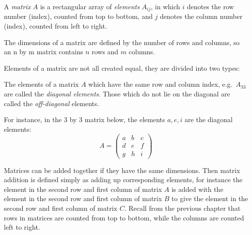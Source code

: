 \documentclass[
  letterpaper,
  DIV=11,
  numbers=noendperiod]{scrreprt}
\begin{document}
\begin{tcolorbox}[enhanced jigsaw, coltitle=black, arc=.35mm, opacitybacktitle=0.6, breakable, bottomtitle=1mm, toptitle=1mm, titlerule=0mm, colback=white, leftrule=.75mm, rightrule=.15mm, colframe=quarto-callout-note-color-frame, colbacktitle=quarto-callout-note-color!10!white, opacityback=0, title=\textcolor{quarto-callout-note-color}{\faInfo}\hspace{0.5em}{Definition}, left=2mm, toprule=.15mm, bottomrule=.15mm]

A \emph{matrix} \(A\) is a rectangular array of \emph{elements}
\(A_{ij}\), in which \(i\) denotes the row number (index), counted from
top to bottom, and \(j\) denotes the column number (index), counted from
left to right.

The dimensions of a matrix are defined by the number of rows and
columns, so an n by m matrix contains \(n\) rows and \(m\) columns.

\end{tcolorbox}

Elements of a matrix are not all created equal, they are divided into
two types:

\begin{tcolorbox}[enhanced jigsaw, coltitle=black, arc=.35mm, opacitybacktitle=0.6, breakable, bottomtitle=1mm, toptitle=1mm, titlerule=0mm, colback=white, leftrule=.75mm, rightrule=.15mm, colframe=quarto-callout-note-color-frame, colbacktitle=quarto-callout-note-color!10!white, opacityback=0, title=\textcolor{quarto-callout-note-color}{\faInfo}\hspace{0.5em}{Definition}, left=2mm, toprule=.15mm, bottomrule=.15mm]

The elements of a matrix \(A\) which have the same row and column index,
e.g.~\(A_{33}\) are called the \emph{diagonal elements}. Those which do
not lie on the diagonal are called the \emph{off-diagonal} elements.

\end{tcolorbox}

For instance, in the 3 by 3 matrix below, the elements \(a, e, i\) are
the diagonal elements: \[
A = \left(\begin{array}{ccc}a & b & c \\d & e & f \\g & h & i\end{array}\right)
\]

Matrices can be added together if they have the same dimensions. Then
matrix addition is defined simply as adding up corresponding elements,
for instance the element in the second row and first column of matrix
\(A\) is added with the element in the second row and first column of
matrix \(B\) to give the element in the second row and first column of
matrix \(C\). Recall from the previous chapter that rows in matrices are
counted from top to bottom, while the columns are counted left to right.
\end{document}
